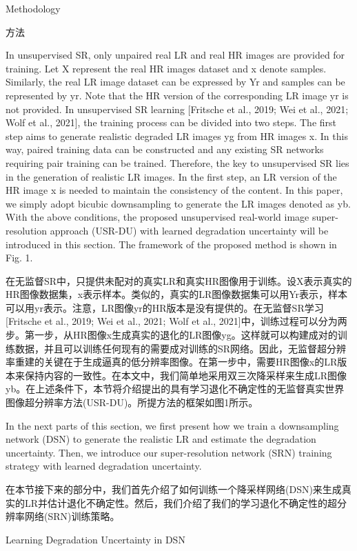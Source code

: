 Methodology

方法

In unsupervised SR, only unpaired real LR and real HR images are provided for training. Let X represent the real HR images dataset and x denote samples. Similarly, the real LR image dataset can be expressed by Yr and samples can be represented by yr. Note that the HR version of the corresponding LR image yr is not provided. In unsupervised SR learning [Fritsche et al., 2019; Wei et al., 2021; Wolf et al., 2021], the training process can be divided into two steps. The first step aims to generate realistic degraded LR images yg from HR images x. In this way, paired training data can be constructed and any existing SR networks requiring pair training can be trained. Therefore, the key to unsupervised SR lies in the generation of realistic LR images. In the first step, an LR version of the HR image x is needed to maintain the consistency of the content. In this paper, we simply adopt bicubic downsampling to generate the LR images denoted as yb. With the above conditions, the proposed unsupervised real-world image super-resolution approach (USR-DU) with learned degradation uncertainty will be introduced in this section. The framework of the proposed method is shown in Fig. 1.

在无监督SR中，只提供未配对的真实LR和真实HR图像用于训练。设X表示真实的HR图像数据集，x表示样本。类似的，真实的LR图像数据集可以用Yr表示，样本可以用yr表示。注意，LR图像yr的HR版本是没有提供的。在无监督SR学习[Fritsche et al., 2019; Wei et al., 2021; Wolf et al., 2021]中，训练过程可以分为两步。第一步，从HR图像x生成真实的退化的LR图像yg。这样就可以构建成对的训练数据，并且可以训练任何现有的需要成对训练的SR网络。因此，无监督超分辨率重建的关键在于生成逼真的低分辨率图像。在第一步中，需要HR图像x的LR版本来保持内容的一致性。在本文中，我们简单地采用双三次降采样来生成LR图像yb。在上述条件下，本节将介绍提出的具有学习退化不确定性的无监督真实世界图像超分辨率方法(USR-DU)。所提方法的框架如图1所示。

In the next parts of this section, we first present how we train a downsampling network (DSN) to generate the realistic LR and estimate the degradation uncertainty. Then, we introduce our super-resolution network (SRN) training strategy with learned degradation uncertainty.

在本节接下来的部分中，我们首先介绍了如何训练一个降采样网络(DSN)来生成真实的LR并估计退化不确定性。然后，我们介绍了我们的学习退化不确定性的超分辨率网络(SRN)训练策略。

Learning Degradation Uncertainty in DSN

